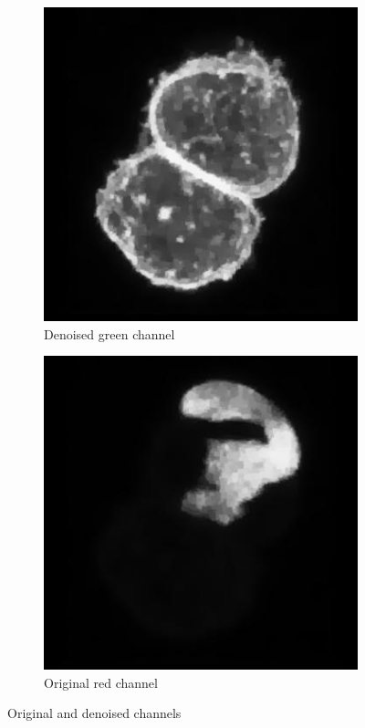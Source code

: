 \documentclass[a4paper,11pt]{ijamas}
\begin{document}
\begin{figure}[!h]
\begin{subfigure}{.48\textwidth}
  \centering
  \includegraphics[width=0.80\columnwidth]{./figs/2bG.jpg}
 \caption{Denoised green channel}
  \label{fig:gchannel_1_denoised}
\end{subfigure}%
\begin{subfigure}{.48\textwidth}
  \centering
  \includegraphics[width=0.80\columnwidth]{./figs/2bR.jpg}
 \caption{Original red channel}
  \label{fig:rchannel_1_denoised}
\end{subfigure}%
\caption{Original and denoised channels}
\label{Flo:cell_positions_and_shape}
\end{figure}
\end{document}
